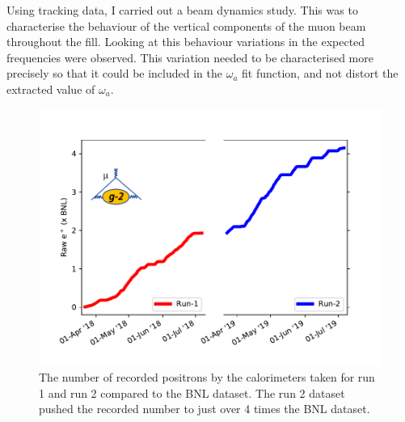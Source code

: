 Using tracking data, I carried out a beam dynamics study. This was to characterise the behaviour of the vertical components of the muon beam throughout the fill. Looking at this behaviour variations in the expected frequencies were observed. This variation needed to be characterised more precisely so that it could be included in the $\omega_{a}$ fit function, and not distort the extracted value of $\omega_{a}$.



\begin{figure}[th]
\centering
\includegraphics[scale=0.8]{Figures/plot_integrated_ctag.pdf}
\decoRule
\caption{The number of recorded positrons by the calorimeters taken for run 1 and run 2 compared to the BNL dataset. The run 2 dataset pushed the recorded number to just over 4 times the BNL dataset.}
\label{fig:plot_integrated_ctag}
\end{figure}
